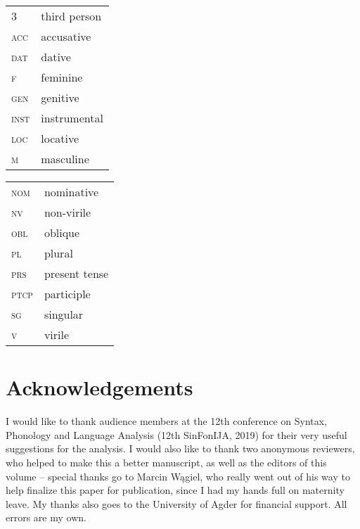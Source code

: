 \documentclass[output=paper]{langscibook}
\begin{document}
\begin{tabularx}{.5\textwidth}{@{}lX@{}}
\textsc{3}&third person\\
\textsc{acc}&{accusative}\\
\textsc{dat}&{dative}\\
\textsc{f}&{feminine}\\
\textsc{gen}&{genitive}\\
\textsc{inst}&{instrumental}\\
\textsc{loc}&{locative}\\
\textsc{m}&{masculine}\\
\end{tabularx}%
\begin{tabularx}{.5\textwidth}{@{}lX@{}}
\textsc{nom}&{nominative}\\
\textsc{nv}&{non-virile}\\
\textsc{obl}&{oblique}\\
\textsc{pl}&{plural}\\
\textsc{prs}&{present tense}\\
\textsc{ptcp}&{participle}\\
\textsc{sg}&singular\\
\textsc{v}&{virile}\\
\end{tabularx}

\section*{Acknowledgements}
I would like to thank audience members at the 12th conference on Syntax, Phonology and Language Analysis (12th SinFonIJA, 2019) for their very useful suggestions for the analysis. I would also like to thank two anonymous reviewers, who helped to make this a better manuscript, as well as the editors of this volume -- special thanks go to Marcin Wągiel, who really went out of his way to help finalize this paper for publication, since I had my hands full on maternity leave. My thanks also goes to the University of Agder for financial support. All errors are my own.

{\sloppy\printbibliography[heading=subbibliography,notkeyword=this]}
\end{document}
